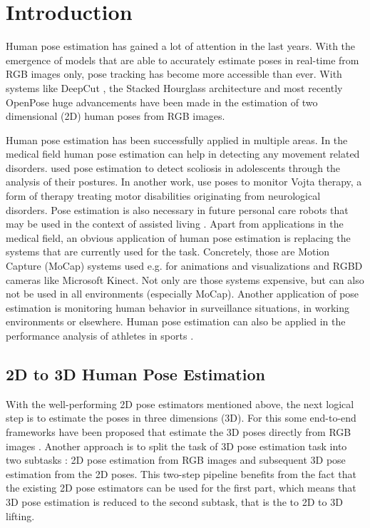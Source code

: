 \section{Introduction}

Human pose estimation has gained a lot of attention in the last years.
With the emergence of models that are able to accurately estimate poses in real-time from RGB images only, pose tracking has become more accessible than ever.
With systems like DeepCut \cite{pishchulin16}, the Stacked Hourglass architecture \cite{newell16} and most recently OpenPose \cite{cao18} huge advancements have been made in the estimation of two dimensional (2D) human poses from RGB images.

Human pose estimation has been successfully applied in multiple areas.
In the medical field human pose estimation can help in detecting any movement related disorders.
\citet{aroeira16} used pose estimation to detect scoliosis in adolescents through the analysis of their postures.
In another work, \citet{khan18} use poses to monitor Vojta therapy, a form of therapy treating motor disabilities originating from neurological disorders.
Pose estimation is also necessary in future personal care robots that may be used in the context of assisted living \cite{richter15}.
Apart from applications in the medical field, an obvious application of human pose estimation is replacing the systems that are currently used for the task.
Concretely, those are Motion Capture (MoCap) systems used e.g. for animations and visualizations and RGBD cameras like Microsoft Kinect.
Not only are those systems expensive, but can also not be used in all environments (especially MoCap).
Another application of pose estimation is monitoring human behavior in surveillance situations, in working environments or elsewhere.
Human pose estimation can also be applied in the performance analysis of athletes in sports \cite{einfalt18, zecha19}.


\subsection{2D to 3D Human Pose Estimation}
With the well-performing 2D pose estimators mentioned above, the next logical step is to estimate the poses in three dimensions (3D).
For this some end-to-end frameworks have been proposed that estimate the 3D poses directly from RGB images \cite{pavlakos17, park16, mehta17, mehta17_2}.
Another approach is to split the task of 3D pose estimation task into two subtasks \cite{drover18, martinez17, moreno-noguer16}:
2D pose estimation from RGB images and subsequent 3D pose estimation from the 2D poses.
This two-step pipeline benefits from the fact that the existing 2D pose estimators can be used for the first part, which means that 3D pose estimation is reduced to the second subtask, that is the to 2D to 3D lifting.


